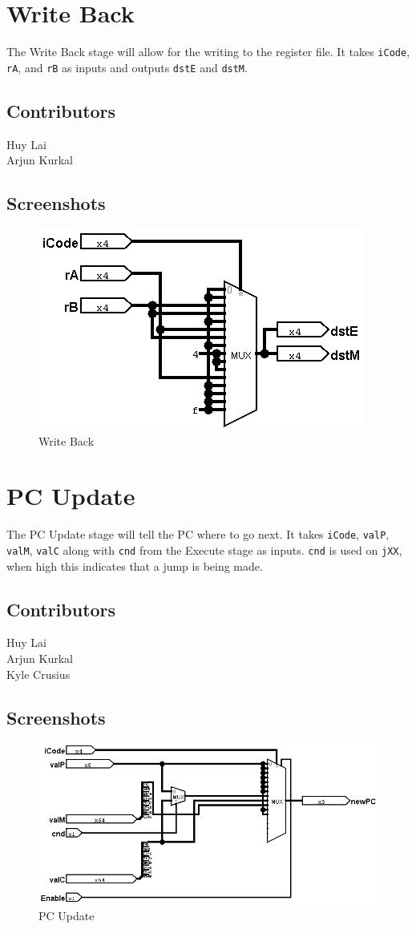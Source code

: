 \clearpage
\section*{Write Back}
The Write Back stage will allow for the writing to the register file. It takes \verb+iCode+, \verb+rA+, and \verb+rB+ as inputs and outputs \verb+dstE+ and \verb+dstM+.

\subsection*{Contributors}
Huy Lai\\
Arjun Kurkal
\subsection*{Screenshots}
\begin{figure}[!ht]
    \centering
    \includegraphics[width=\textwidth]{Images/WriteBack.png}
    \caption{Write Back}
\end{figure}

\clearpage
\section*{PC Update}
The PC Update stage will tell the PC where to go next. It takes \verb+iCode+, \verb+valP+, \verb+valM+, \verb+valC+ along with \verb+cnd+ from the Execute stage as inputs. \verb+cnd+ is used on \verb+jXX+, when high this indicates that a jump is being made.
\subsection*{Contributors}
Huy Lai\\
Arjun Kurkal\\
Kyle Crusius

\subsection*{Screenshots}
\begin{figure}[!ht]
    \centering
    \includegraphics[width=\textwidth]{Images/PCUpdate.png}
    \caption{PC Update}
\end{figure}